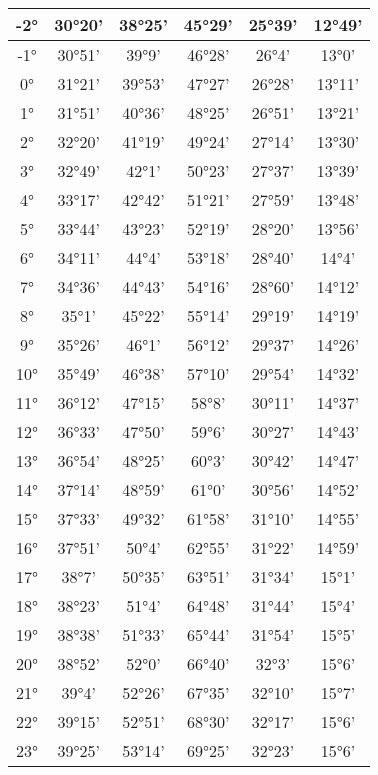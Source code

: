 \documentclass[14pt, openany]{article}
\begin{document}
\begin{tabular}{c|c|c|c|c|c}
		-2° & 30°20' & 38°25' & 45°29' & 25°39' & 12°49' \\ \hline
		-1° & 30°51' & 39°9' & 46°28' & 26°4' & 13°0' \\ \hline
		0° & 31°21' & 39°53' & 47°27' & 26°28' & 13°11' \\ \hline
		1° & 31°51' & 40°36' & 48°25' & 26°51' & 13°21' \\ \hline
		2° & 32°20' & 41°19' & 49°24' & 27°14' & 13°30' \\ \hline
		3° & 32°49' & 42°1' & 50°23' & 27°37' & 13°39' \\ \hline
		4° & 33°17' & 42°42' & 51°21' & 27°59' & 13°48' \\ \hline
		5° & 33°44' & 43°23' & 52°19' & 28°20' & 13°56' \\ \hline
		6° & 34°11' & 44°4' & 53°18' & 28°40' & 14°4' \\ \hline
		7° & 34°36' & 44°43' & 54°16' & 28°60' & 14°12' \\ \hline
		8° & 35°1' & 45°22' & 55°14' & 29°19' & 14°19' \\ \hline
		9° & 35°26' & 46°1' & 56°12' & 29°37' & 14°26' \\ \hline
		10° & 35°49' & 46°38' & 57°10' & 29°54' & 14°32' \\ \hline
		11° & 36°12' & 47°15' & 58°8' & 30°11' & 14°37' \\ \hline
		12° & 36°33' & 47°50' & 59°6' & 30°27' & 14°43' \\ \hline
		13° & 36°54' & 48°25' & 60°3' & 30°42' & 14°47' \\ \hline
		14° & 37°14' & 48°59' & 61°0' & 30°56' & 14°52' \\ \hline
		15° & 37°33' & 49°32' & 61°58' & 31°10' & 14°55' \\ \hline
		16° & 37°51' & 50°4' & 62°55' & 31°22' & 14°59' \\ \hline
		17° & 38°7' & 50°35' & 63°51' & 31°34' & 15°1' \\ \hline
		18° & 38°23' & 51°4' & 64°48' & 31°44' & 15°4' \\ \hline
		19° & 38°38' & 51°33' & 65°44' & 31°54' & 15°5' \\ \hline
		20° & 38°52' & 52°0' & 66°40' & 32°3' & 15°6' \\ \hline
		21° & 39°4' & 52°26' & 67°35' & 32°10' & 15°7' \\ \hline
		22° & 39°15' & 52°51' & 68°30' & 32°17' & 15°6' \\ \hline
		23° & 39°25' & 53°14' & 69°25' & 32°23' & 15°6' \\ 
	\end{tabular}
\end{document}
